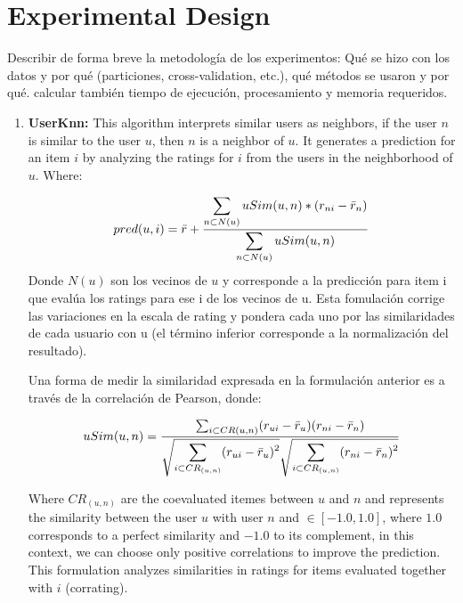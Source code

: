 \documentclass[letterpaper, 10 pt, conference]{ieeeconf}  %
\begin{document}
\section{Experimental Design}

Describir de forma breve la metodología de los experimentos: Qué
se hizo con los datos y por qué (particiones, cross-validation, etc.), qué métodos se usaron y por
qué.
calcular también tiempo de ejecución, procesamiento y memoria requeridos.
\begin{enumerate}

    \item \textbf{UserKnn:} This algorithm interprets similar users as neighbors, if the user $n$ is similar to the user $u$, then $n$ is a neighbor of $u$. It generates a prediction for an item $i$ by analyzing the ratings for $i$ from the users in the neighborhood of $u$. Where:
    
    \begin{equation}
        pred(u,i)=\Bar{r}+ \frac{\displaystyle \sum_{n \subset N(u)}uSim(u,n)*(r_{ni}-\Bar{r}_{n})}{\displaystyle \sum_{n \subset N(u)}uSim(u,n)}
    \end{equation}
    Donde $N(u)$ son los vecinos de $u$ y corresponde a la predicción para item i que evalúa los ratings para ese i de los vecinos de u. Esta fomulación corrige las variaciones en la escala de rating y pondera cada uno por las similaridades de cada usuario con u (el término inferior corresponde a la normalización del resultado).
    
    Una forma de medir la similaridad expresada en la formulación anterior es a través de la correlación de Pearson, donde: 
    
    \begin{equation}
        uSim(u,n)= \frac{ \sum_{i \subset CR(u,n)}(r_{ui}-\Bar{r}_{u})(r_{ni}-\Bar{r}_{n})}{ \displaystyle \sqrt{\displaystyle \sum_{i \subset CR_{(u,n)}}(r_{ui}-\Bar{r}_{u})^2}  \sqrt{\displaystyle \sum_{i \subset CR_{(u,n)}}(r_{ni}-\Bar{r}_{n})^2} }
    \end{equation}
    
    Where $CR_{(u, n)} $ are the coevaluated itemes between $ u $ and $ n $ and represents the similarity between the user $ u $ with user  $ n $ and $ \in [-1.0, 1.0] $, where $ 1.0 $ corresponds to a perfect similarity and $ -1.0 $ to its complement, in this context, we can choose only positive correlations to improve the prediction. This formulation analyzes similarities in ratings for items evaluated together with $ i $ (corrating).
    

\end{enumerate}
\end{document}

